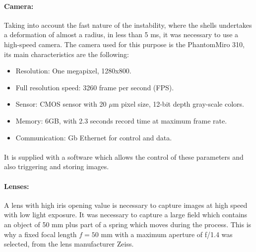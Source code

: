 \paragraph{Camera:}
Taking into account the fast nature of the instability, where the shells undertakes a deformation of almost a radius, in less than 5 ms, it was necessary to use a high-speed camera.
The camera used for this purpose is the Phantom\textcopyright Miro 310, its main characteristics are the following:
\begin{itemize}
	\item Resolution: One megapixel, 1280x800.
	\item Full resolution speed: 3260 frame per second (FPS).
	\item Sensor: CMOS sensor with 20 $\mu$m pixel size, 12-bit depth gray-scale colors.
	\item Memory: 6GB, with 2.3 seconds record time at maximum frame rate.
	\item Communication: Gb Ethernet for control and data.
\end{itemize}
\paragraph{}
It is supplied with a software which allows the control of these parameters and also triggering and storing images.
\paragraph{Lenses:}
A lens with high iris opening value is necessary to capture images at high speed with low light exposure. It was necessary to capture a large field which contains an object of 50 mm plus part of a spring which moves during the process. This is why a fixed focal length $f= 50$ mm with a maximum aperture of f/1.4 was selected, from the lens manufacturer Zeiss\textcopyright.

